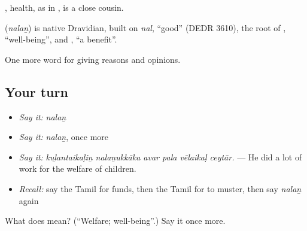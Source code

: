 , health, as in  , is a close cousin.

\begin{cousinweb}
\textbf{} (\emph{nalaṉ}) is native Dravidian, built on \emph{nal}, \textquotedblleft{}good\textquotedblright{} (DEDR 3610), the root of , \textquotedblleft{}well-being\textquotedblright{}, and , \textquotedblleft{}a benefit\textquotedblright{}.
\end{cousinweb}

\begin{grammarlens}[title={What you've built}]
One more word for giving reasons and opinions.
\end{grammarlens}

\subsection*{Your turn}
\begin{itemize}
\raggedright
  \item \emph{Say it:} \emph{nalaṉ}
  \item \emph{Say it:} \emph{nalaṉ}, once more
  \item \emph{Say it:} \emph{kuḻantaikaḷiṉ nalaṉukkāka avar pala vēlaikaḷ ceytār.} — He did a lot of work for the welfare of children.
  \item \emph{Recall:} say the Tamil for funds, then the Tamil for to muster, then say \emph{nalaṉ} again
\end{itemize}

\begin{tcolorbox}[breakable,colback=teal!4,colframe=teal!35!black,title={Before you move on}]
What does  mean? (\textquotedblleft{}Welfare; well-being\textquotedblright{}.) Say it once more.
\end{tcolorbox}
